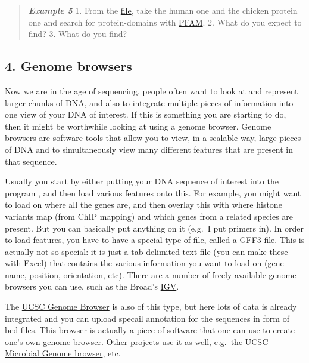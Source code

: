\documentclass[]{article}
\begin{document}
\begin{quote}
\emph{\textbf{Example 5}} 1. From the
\href{http://compbio.massey.ac.nz/wiki/data/c1/BRCA2_aa.fasta}{file},
take the human one and the chicken protein one and search for
protein-domains with \href{http://pfam.xfam.org/}{PFAM}. 2. What do you
expect to find? 3. What do you find?
\end{quote}

\subsection{4. Genome browsers}\label{genome-browsers}

Now we are in the age of sequencing, people often want to look at and
represent larger chunks of DNA, and also to integrate multiple pieces of
information into one view of your DNA of interest. If this is something
you are starting to do, then it might be worthwhile looking at using a
genome browser. Genome browsers are software tools that allow you to
view, in a scalable way, large pieces of DNA and to simultaneously view
many different features that are present in that sequence.

Usually you start by either putting your DNA sequence of interest into
the program , and then load various features onto this. For example, you
might want to load on where all the genes are, and then overlay this
with where histone variants map (from ChIP mapping) and which genes from
a related species are present. But you can basically put anything on it
(e.g.~I put primers in). In order to load features, you have to have a
special type of file, called a
\href{http://compbio.massey.ac.nz/wiki/\#!bioinf_files.md}{GFF3 file}.
This is actually not so special: it is just a tab-delimited text file
(you can make these with Excel) that contains the various information
you want to load on (gene name, position, orientation, etc). There are a
number of freely-available genome browsers you can use, such as the
Broad's \href{https://www.broadinstitute.org/igv/home}{IGV}.

The \href{http://genome.ucsc.edu/}{UCSC Genome Browser} is also of this
type, but here lots of data is already integrated and you can upload
specail annotation for the sequences in form of
\href{http://compbio.massey.ac.nz/wiki/\#!bioinf_files.md}{bed-files}.
This browser is actually a piece of software that one can use to create
one's own genome browser. Other projects use it as well, e.g.~the
\href{http://microbes.ucsc.edu/}{UCSC Microbial Genome browser}, etc.
\end{document}
